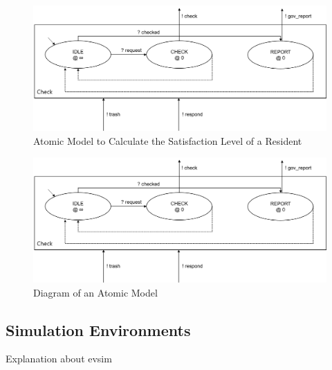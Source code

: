 \documentclass{scsSimAUDPaperFormat}
\begin{document}
\begin{figure}[!h]
    \centering
    \includegraphics[width=1.0\columnwidth]{fig/check_model.png}
    \caption{Atomic Model to Calculate the Satisfaction Level of a Resident}
    \label{Fig:Checkmodel}
\end{figure}

\begin{figure}[!h]
    \centering
    \includegraphics[width=1.0\columnwidth]{fig/check_model.png}
    \caption{Diagram of an Atomic Model}
    \label{Fig:Checkmodel}
\end{figure}







\subsection{Simulation Environments}


Explanation about evsim
\end{document}
